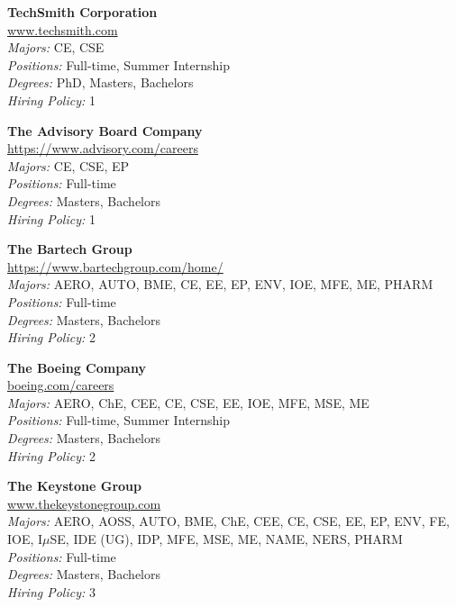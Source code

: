 \documentclass{article}
\begin{document}
\begin{center}
\begin{multicols}{3}
\begin{minipage}{.9\columnwidth}{\Large\bf TechSmith Corporation }\\
	\url{www.techsmith.com}\\
	\emph{Majors:} CE, CSE\\
	\emph{Positions:} Full-time, Summer Internship\\
	\emph{Degrees:} PhD, Masters, Bachelors\\
	\emph{Hiring Policy:} 1\\
\end{minipage}
 
\begin{minipage}{.9\columnwidth}{\Large\bf The Advisory Board Company }\\
	\url{https://www.advisory.com/careers}\\
	\emph{Majors:} CE, CSE, EP\\
	\emph{Positions:} Full-time\\
	\emph{Degrees:} Masters, Bachelors\\
	\emph{Hiring Policy:} 1\\
\end{minipage}
 
\begin{minipage}{.9\columnwidth}{\Large\bf The Bartech Group }\\
	\url{https://www.bartechgroup.com/home/}\\
	\emph{Majors:} AERO, AUTO, BME, CE, EE, EP, ENV, IOE, MFE, ME, PHARM\\
	\emph{Positions:} Full-time\\
	\emph{Degrees:} Masters, Bachelors\\
	\emph{Hiring Policy:} 2\\
\end{minipage}
 
\begin{minipage}{.9\columnwidth}{\Large\bf The Boeing Company }\\
	\url{boeing.com/careers}\\
	\emph{Majors:} AERO, ChE, CEE, CE, CSE, EE, IOE, MFE, MSE, ME\\
	\emph{Positions:} Full-time, Summer Internship\\
	\emph{Degrees:} Masters, Bachelors\\
	\emph{Hiring Policy:} 2\\
\end{minipage}
 
\begin{minipage}{.9\columnwidth}{\Large\bf The Keystone Group }\\
	\url{www.thekeystonegroup.com}\\
	\emph{Majors:} AERO, AOSS, AUTO, BME, ChE, CEE, CE, CSE, EE, EP, ENV, FE, IOE, I$\mu$SE, IDE (UG), IDP, MFE, MSE, ME, NAME, NERS, PHARM\\
	\emph{Positions:} Full-time\\
	\emph{Degrees:} Masters, Bachelors\\
	\emph{Hiring Policy:} 3\\
\end{minipage}
 

\end{multicols}
\end{center}
\end{document}
